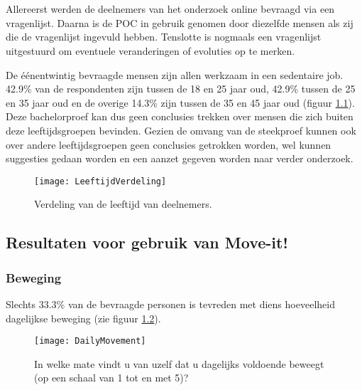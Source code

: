 \chapter{}%
\label{ch:analyse}

Allereerst werden de deelnemers van het onderzoek online bevraagd via een vragenlijst. Daarna is de POC in gebruik genomen door diezelfde mensen als zij die de vragenlijst ingevuld hebben. Tenslotte is nogmaals een vragenlijst uitgestuurd om eventuele veranderingen of evoluties op te merken.

De éénentwintig bevraagde mensen zijn allen werkzaam in een sedentaire job. 42.9\% van de respondenten zijn tussen de 18 en 25 jaar oud, 42.9\% tussen de 25 en 35 jaar oud en de overige 14.3\% zijn tussen de 35 en 45 jaar oud (figuur \ref{fig:leeftijd}). Deze bachelorproef kan dus geen conclusies trekken over mensen die zich buiten deze leeftijdsgroepen bevinden. Gezien de omvang van de steekproef kunnen ook over andere leeftijdsgroepen geen conclusies getrokken worden, wel kunnen suggesties gedaan worden en een aanzet gegeven worden naar verder onderzoek.

\begin{figure}
    \caption[Verdeling van de leeftijd van deelnemers]{Verdeling van de leeftijd van deelnemers.}
    \texttt{[image: LeeftijdVerdeling]}
    \label{fig:leeftijd}
\end{figure}

\section{Resultaten voor gebruik van Move-it!}

\subsection{Beweging}
Slechts 33.3\% van de bevraagde personen is tevreden met diens hoeveelheid dagelijkse beweging (zie figuur \ref{fig:dagelijkseBeweging}).

\begin{figure}
    \caption[In welke mate vindt u van uzelf dat u dagelijks voldoende beweegt?]{In welke mate vindt u van uzelf dat u dagelijks voldoende beweegt (op een schaal van 1 tot en met 5)?}
    \texttt{[image: DailyMovement]}
    \label{fig:dagelijkseBeweging}
\end{figure}

